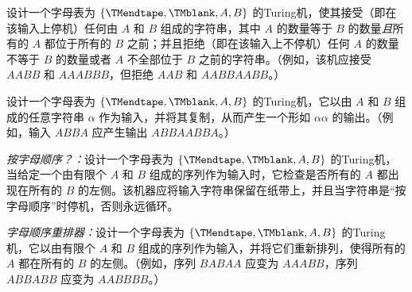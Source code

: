 \documentclass[../../../include/open-logic-section]{subfiles}
\begin{document}
\begin{prob}
设计一个字母表为 $\{\TMendtape,\TMblank, A, B\}$ 的Turing机，使其接受（即在该输入上停机）任何由 $A$ 和 $B$ 组成的字符串，其中 $A$ 的数量等于 $B$ 的数量\emph{且}所有的 $A$ 都位于所有的 $B$ 之前；并且拒绝（即在该输入上不停机）任何 $A$ 的数量不等于 $B$ 的数量或者 $A$ 不全部位于 $B$ 之前的字符串。（例如，该机应接受 $AABB$ 和 $AAABBB$，但拒绝 $AAB$ 和 $AABBAABB$。）
\end{prob}

\begin{prob}
设计一个字母表为 $\{\TMendtape,\TMblank, A, B\}$ 的Turing机，它以由 $A$ 和 $B$ 组成的任意字符串 $\alpha$ 作为输入，并将其复制，从而产生一个形如 $\alpha\alpha$ 的输出。（例如，输入 $ABBA$ 应产生输出 $ABBAABBA$。）
\end{prob}

\begin{prob}
\emph{按字母顺序？：}设计一个字母表为 $\{\TMendtape,\TMblank, A, B\}$ 的Turing机，当给定一个由有限个 $A$ 和 $B$ 组成的序列作为输入时，它检查是否所有的 $A$ 都出现在所有的 $B$ 的左侧。该机器应将输入字符串保留在纸带上，并且当字符串是“按字母顺序”时停机，否则永远循环。
\end{prob}

\begin{prob}
\emph{字母顺序重排器：}设计一个字母表为 $\{\TMendtape,\TMblank, A, B\}$ 的Turing机，它以由有限个 $A$ 和 $B$ 组成的序列作为输入，并将它们重新排列，使得所有的 $A$ 都在所有的 $B$ 的左侧。（例如，序列 $BABAA$ 应变为 $AAABB$，序列 $ABBABB$ 应变为 $AABBBB$。）
\end{prob}
\end{document}
